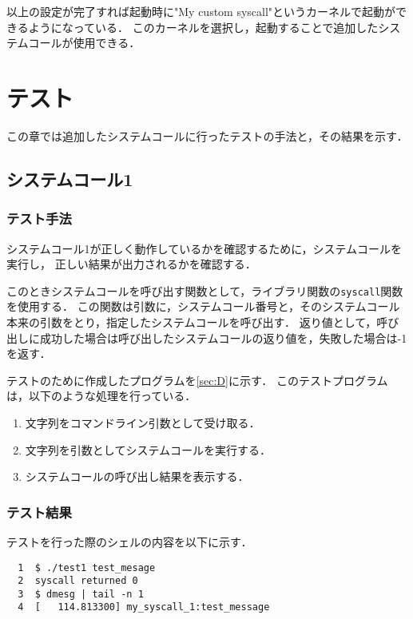 \documentclass[12pt]{jsarticle}
\begin{document}
以上の設定が完了すれば起動時に"My custom syscall"というカーネルで起動ができるようになっている．
このカーネルを選択し，起動することで追加したシステムコールが使用できる．


\section{テスト}
\label{sec:test}
この章では追加したシステムコールに行ったテストの手法と，その結果を示す．


\subsection{システムコール1}

\subsubsection{テスト手法}
システムコール1が正しく動作しているかを確認するために，システムコールを実行し，
正しい結果が出力されるかを確認する．

このときシステムコールを呼び出す関数として，ライブラリ関数の\verb|syscall|関数を使用する．
この関数は引数に，システムコール番号と，そのシステムコール本来の引数をとり，指定したシステムコールを呼び出す．
返り値として，呼び出しに成功した場合は呼び出したシステムコールの返り値を，失敗した場合は-1を返す．

テストのために作成したプログラムを\ref{sec:D}に示す．
このテストプログラムは，以下のような処理を行っている．
\begin{enumerate}
  \item 文字列をコマンドライン引数として受け取る．
  \item 文字列を引数としてシステムコールを実行する．
  \item システムコールの呼び出し結果を表示する．
\end{enumerate}

\subsubsection{テスト結果}
テストを行った際のシェルの内容を以下に示す．
\begin{verbatim}
  1  $ ./test1 test_mesage
  2  syscall returned 0
  3  $ dmesg | tail -n 1
  4  [   114.813300] my_syscall_1:test_message
\end{verbatim}
\end{document}
